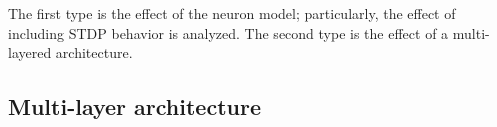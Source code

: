 	The first type is the effect of the neuron model; particularly, the effect of including STDP behavior is analyzed.
	The second type is the effect of a multi-layered architecture.

	\subsection{Multi-layer architecture}

